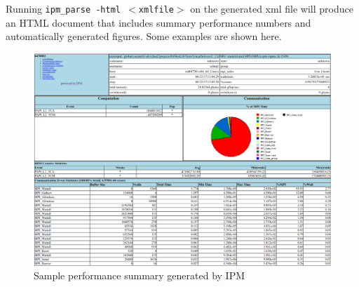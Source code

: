 Running {\tt ipm\_parse -html $<$xmlfile$>$} on the generated xml file
will produce an HTML document that includes summary performance numbers
and automatically generated figures.  Some examples are shown here.

\begin{figure}
  \begin{center}
    \includegraphics[width=\columnwidth]{Profiling/figs/summary.png}
  \end{center}
  \caption{
    Sample performance summary generated by IPM
  }
  \label{fig:ipm-summary}
\end{figure}

